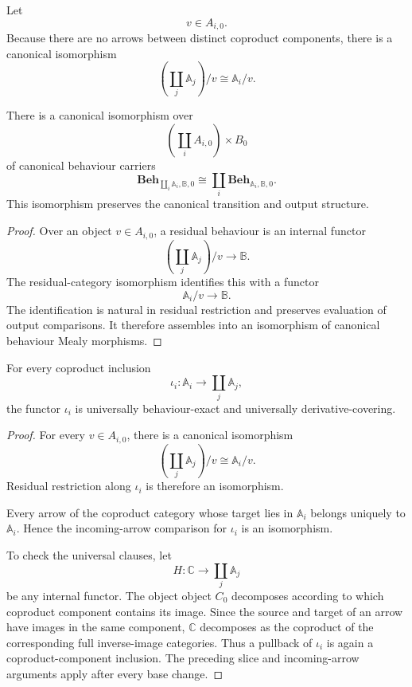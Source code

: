 Let
\[
    v\in A_{i,0}.
\]
Because there are no arrows between distinct coproduct components, there is a
canonical isomorphism
\[
    \left(
        \coprod_j\mathbb A_j
    \right)/v
    \cong
    \mathbb A_i/v.
\]

\begin{proposition}
\label{prop:extensive-decomposition-canonical-behaviours}
There is a canonical isomorphism over
\[
    \left(
        \coprod_iA_{i,0}
    \right)
    \times B_0
\]
of canonical behaviour carriers
\[
    \mathbf{Beh}_{\coprod_i\mathbb A_i,\mathbb B,0}
    \cong
    \coprod_i
    \mathbf{Beh}_{\mathbb A_i,\mathbb B,0}.
\]
This isomorphism preserves the canonical transition and output structure.
\end{proposition}

\begin{proof}
Over an object \(v\in A_{i,0}\), a residual behaviour is an internal functor
\[
    \left(
        \coprod_j\mathbb A_j
    \right)/v
    \to
    \mathbb B.
\]
The residual-category isomorphism identifies this with a functor
\[
    \mathbb A_i/v\to\mathbb B.
\]
The identification is natural in residual restriction and preserves
evaluation of output comparisons. It therefore assembles into an isomorphism
of canonical behaviour Mealy morphisms.
\end{proof}

\begin{proposition}
\label{prop:residual-exactness-coproduct-inclusions}
For every coproduct inclusion
\[
    \iota_i:
    \mathbb A_i\to\coprod_j\mathbb A_j,
\]
the functor \(\iota_i\) is universally behaviour-exact and universally
derivative-covering.
\end{proposition}

\begin{proof}
For every \(v\in A_{i,0}\), there is a canonical isomorphism
\[
    \left(\coprod_j\mathbb A_j\right)/v
    \cong
    \mathbb A_i/v.
\]
Residual restriction along \(\iota_i\) is therefore an isomorphism.

Every arrow of the coproduct category whose target lies in
\(\mathbb A_i\) belongs uniquely to \(\mathbb A_i\). Hence the
incoming-arrow comparison for \(\iota_i\) is an isomorphism.

To check the universal clauses, let
\[
    H:\mathbb C\to\coprod_j\mathbb A_j
\]
be any internal functor. The object object \(C_0\) decomposes according to
which coproduct component contains its image. Since the source and target of
an arrow have images in the same component, \(\mathbb C\) decomposes as the
coproduct of the corresponding full inverse-image categories. Thus a pullback
of \(\iota_i\) is again a coproduct-component inclusion. The preceding slice
and incoming-arrow arguments apply after every base change.
\end{proof}

